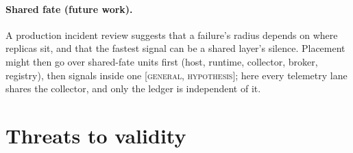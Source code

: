 \documentclass{ceurart}
\newcommand{\scope}[1]{\textsc{[#1]}}
\begin{document}
\paragraph{Shared fate (future work).} A production incident review suggests that a failure's radius depends on where
replicas sit, and that the fastest signal can be a shared layer's silence. %
Placement might then go over shared-fate units first (host, runtime, collector, broker, registry), then signals inside
one \scope{general, hypothesis}; here every telemetry lane shares the collector, and only the ledger is independent of it.

\section{Threats to validity}\label{sec:threats}
\end{document}
